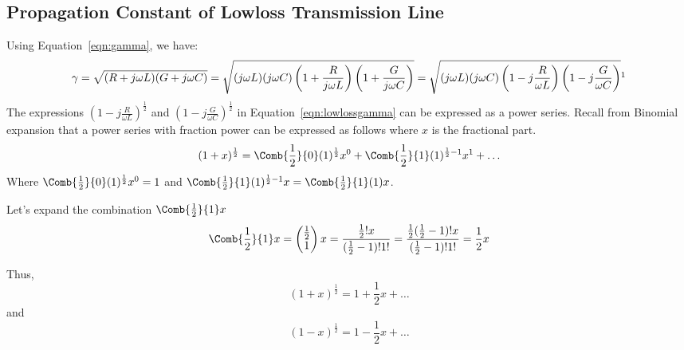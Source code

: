 \subsection{Propagation Constant of Lowloss Transmission Line}
Using Equation~\eqref{eqn:gamma}, we have:
\begin{dmath}
\gamma = \sqrt{(R + j\omega L)(G + j\omega C)}
= \sqrt{{(j\omega L)(j\omega C)\left(1 + \frac{R}{j\omega L}\right)\left(1 + \frac{G}{j\omega C}\right)}}
= \sqrt{{(j\omega L)(j\omega C)\left(1 - j\frac{R}{\omega L}\right)\left(1 - j\frac{G}{\omega C}\right)}}\footnotemark
\label{eqn:lowlossgamma}
\end{dmath}
The expressions $\left(1 - j\frac{R}{\omega L}\right)^{\frac{1}{2}}$ and $\left(1 - j\frac{G}{\omega C}\right)^{\frac{1}{2}}$ in Equation~\eqref{eqn:lowlossgamma} can be expressed as a power series. Recall from Binomial expansion that a power series with fraction power can be expressed as follows where $x$ is the fractional part.
\begin{dmath*}
(1 + x)^{\frac{1}{2}} = \Comb{\frac{1}{2}}{0}(1)^{\frac{1}{2}}x^0 + \Comb{\frac{1}{2}}{1}(1)^{{\frac{1}{2}} - 1}x^1 + \ldots
\end{dmath*}
Where $\Comb{\frac{1}{2}}{0}(1)^{\frac{1}{2}}x^0 = 1$ and $\Comb{\frac{1}{2}}{1}(1)^{\frac{1}{2} - 1}x = \Comb{\frac{1}{2}}{1}(1)x$.

Let's expand the combination $\Comb{\frac{1}{2}}{1} x$
\begin{dmath*}
\Comb{\frac{1}{2}}{1} x = \begin{pmatrix}\frac{1}{2}\\1 \end{pmatrix}x = \frac{\frac{1}{2}! x}{(\frac{1}{2} - 1)!1!} = \frac{\frac{1}{2}(\frac{1}{2} - 1)! x}{(\frac{1}{2} - 1)!1!} = \frac{1}{2}x
\end{dmath*}

Thus,
\[(1 + x)^{\frac{1}{2}} = 1 + \frac{1}{2}x + \ldots\]
and
\[(1 - x)^{\frac{1}{2}} = 1 - \frac{1}{2}x + \ldots\]


